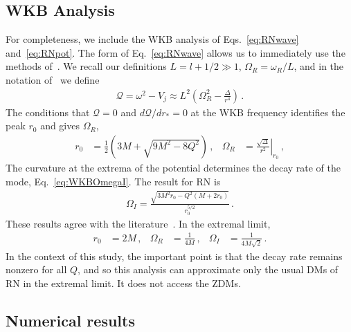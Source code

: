 \begin{refsection}
\subsection{WKB Analysis}

For completeness, we include the WKB analysis of Eqs.~\eqref{eq:RNwave} and~\eqref{eq:RNpot}. The form of Eq.~\eqref{eq:RNwave} allows us to immediately use the methods of~\cite{Schutz:1985zz,IyerWill1987}. We recall our definitions $L = l + 1/2 \gg 1$, $\Omega_R = \omega_R/L$, and in the notation of~\cite{Schutz:1985zz} we define
\begin{align}
\mathcal Q = \omega^2 - V_j \approx L^2 \left(\Omega_R^2 - \frac{\Delta}{r^4} \right) \,.
\end{align}
The conditions that $\mathcal Q = 0$ and $d \mathcal Q/dr_* = 0$ at the WKB frequency identifies the peak $r_0$ and gives $\Omega_R$,
\begin{align}
r_0 & = \frac 12 \left( 3 M + \sqrt{9 M^2 - 8 Q^2}\right) \,, &
\Omega_R & = \left. \frac{\sqrt{\Delta}}{r^2} \right|_{r_0} \,,
\end{align}
The curvature at the extrema of the potential determines the decay rate of the mode, Eq.~\eqref{eq:WKBOmegaI}. The result for RN is
\begin{align}
\Omega_I = \frac{\sqrt{3 M^2 r_0 - Q^2 (M+2r_0)}}{r_0^{5/2}}  \,.
\end{align}
These results agree with the literature~\cite{Kokkotas:1988fm,Andersson:1996xw,Mashhoon1985,Cardoso2009}. In the extremal limit,
\begin{align}
r_0 &= 2 M \,, & \Omega_R & = \frac{1}{4M} \,, & \Omega_I & = \frac{1}{4M \sqrt{2}}\,. 
\end{align}
In the context of this study, the important point is that the decay rate remains nonzero for all $Q$, and so this analysis can approximate only the usual DMs of RN in the extremal limit. It does not access the ZDMs.

\subsection{Numerical results}
\label{sec:RNNumerics}


\end{refsection}
